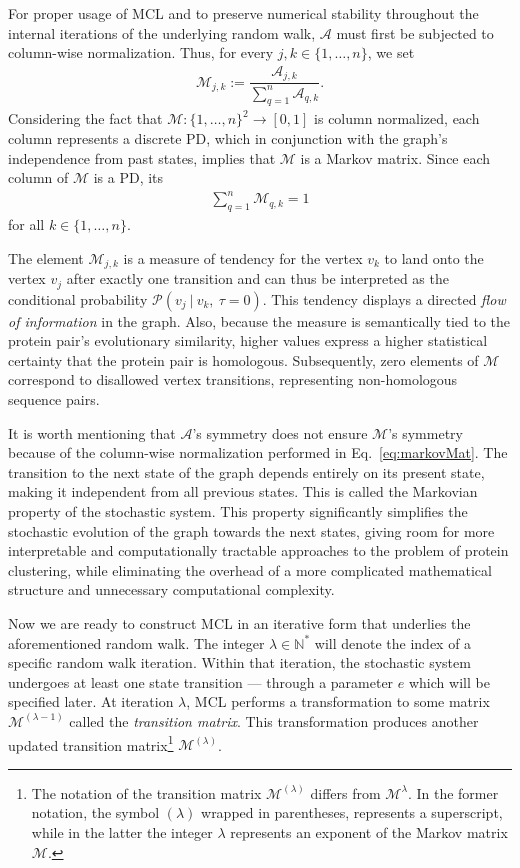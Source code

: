 For proper usage of MCL and to preserve numerical stability throughout the internal iterations of the underlying random walk, \(\mathcal{A}\) must first be subjected to column-wise normalization. Thus, for every \(j,k \in \{ 1, \dots, n \}\), we set
\begin{align}
  \mathcal{M}_{j, k} := \dfrac{\mathcal{A}_{j, k}}{\sum_{q=1}^{n} \mathcal{A}_{q, k}}.
  \label{eq:markovMat}
\end{align}
Considering the fact that \(\mathcal{M} : \{ 1, \dots, n \}^2 \rightarrow [0, 1] \) is column normalized, each column represents a discrete PD, which in conjunction with the graph's independence from past states, implies that \(\mathcal{M}\) is a Markov matrix. Since each column of \(\mathcal{M}\) is a PD, its
\begin{align}
  \sum_{q=1}^{n} \mathcal{M}_{q, k} = 1
  \label{eq:sum1}
\end{align}
for all \(k \in \{ 1, \dots, n \}\).

The element \(\mathcal{M}_{j, k}\) is a measure of tendency for the vertex
\(v_k\) to land onto the vertex \(v_j\) after exactly one transition and can
thus be interpreted as the conditional probability \(\mathcal{P}(v_j \ | \ v_k,
\ \tau = 0)\). This tendency displays a directed \textit{flow of information} in
the graph. Also, because the measure is semantically tied to the protein pair's
evolutionary similarity, higher values express a higher statistical certainty
that the protein pair is homologous.
Subsequently, zero elements of \(\mathcal{M}\) correspond to disallowed vertex
transitions, representing non-homologous sequence pairs.

It is worth mentioning that \(\mathcal{A}\)'s symmetry does not ensure
\(\mathcal{M}\)'s symmetry because of the column-wise normalization performed
in Eq.~\ref{eq:markovMat}. The transition to the next state of the graph
depends entirely on its present state, making it independent from all previous
states. This is called the Markovian property of the stochastic system. This
property significantly simplifies the stochastic evolution of the graph towards
the next states, giving room for more interpretable and computationally
tractable approaches to the problem of protein clustering, while eliminating
the overhead of a more complicated mathematical structure and unnecessary
computational complexity.

Now we are ready to construct MCL in an iterative
form that underlies the aforementioned random walk. The integer \(\lambda \in
\mathbb{N}^*\) will denote the index of a specific random walk iteration.
Within that iteration, the stochastic system undergoes at least one state
transition --- through a parameter \(e\) which will be specified later. At
iteration \(\lambda\), MCL performs a transformation to some matrix
\(\mathcal{M}^{(\lambda-1)}\) called the \textit{transition matrix}. This
transformation produces another updated transition matrix\footnote{The notation
of the transition matrix \(\mathcal{M}^{(\lambda)}\) differs from
\(\mathcal{M}^{\lambda}\). In the former notation, the symbol \((\lambda)\)
wrapped in parentheses, represents a superscript, while in the latter the
integer \(\lambda\) represents an exponent of the Markov matrix
\(\mathcal{M}\).} \(\mathcal{M}^{(\lambda)}\).

